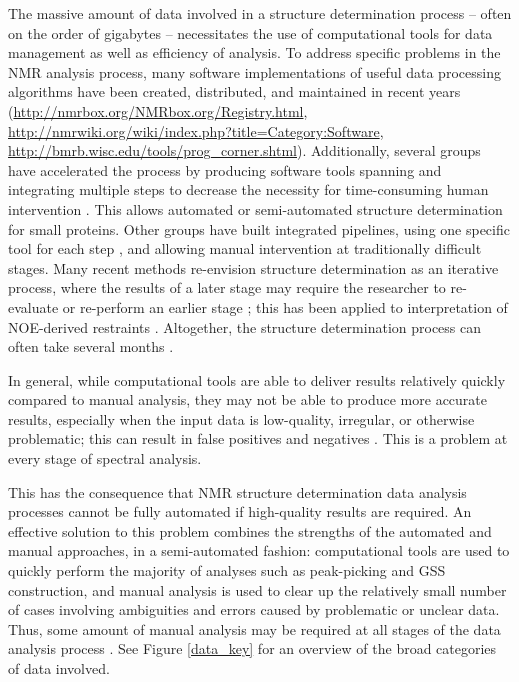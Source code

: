 The massive amount of data involved in a structure determination process --
often on the order of gigabytes -- necessitates the use of computational
tools for data management as well as efficiency of analysis.  To address
specific problems in the NMR analysis process, many software implementations 
of useful data processing algorithms have been created, distributed, and 
maintained in recent years 
(\url{http://nmrbox.org/NMRbox.org/Registry.html}, 
\url{http://nmrwiki.org/wiki/index.php?title=Category:Software}, 
\url{http://bmrb.wisc.edu/tools/prog\_corner.shtml}).  
Additionally, several groups have 
accelerated the process by producing software tools spanning and integrating 
multiple steps to decrease the necessity for time-consuming human intervention
\cite{abacus_assignment}.
This allows automated or semi-automated structure determination for small 
proteins.  Other groups have built integrated pipelines, using one specific 
tool for each step \cite{baran2004automated, sail_flya}, 
and allowing manual intervention at traditionally 
difficult stages.  Many recent methods re-envision structure determination 
as an iterative process, where the results of a later stage may require the 
researcher to re-evaluate or re-perform an earlier stage \cite{cyana2004}; 
this has been applied to interpretation of NOE-derived 
restraints \cite{aria2003}.  Altogether, the structure determination 
process can often take several months \cite{guerry2011automated}.

In general, while computational tools are able to deliver results relatively 
quickly compared to manual analysis, they may not be able to produce more 
accurate results, especially when the input data is low-quality, irregular, or 
otherwise problematic; this can result in false positives and negatives
\cite{williamson2009automated}.  This is a problem at every stage of spectral
analysis.

This has the consequence that NMR structure determination data analysis 
processes cannot be fully automated if high-quality results are required.  
An effective solution to this problem combines the strengths of the automated 
and manual approaches, in a semi-automated fashion:  computational tools are 
used to quickly perform the majority of analyses such as peak-picking and 
GSS construction, and manual analysis is used to clear up the 
relatively small number of cases involving ambiguities and errors caused 
by problematic or unclear data.  Thus, some amount of manual analysis may 
be required at all stages of the data analysis process 
\cite{guntert2009automated, williamson2009automated}.   
See Figure \ref{data_key} for an overview of the broad categories of data 
involved.

